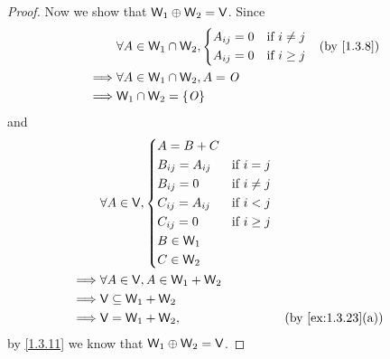 \begin{proof}
  Now we show that \(\mathsf{W}_1 \oplus \mathsf{W}_2 = \mathsf{V}\).
  Since
  \begin{align*}
             & \forall A \in \W_1 \cap \W_2, \begin{dcases}
      A_{i j} = 0 & \text{if } i \neq j \\
      A_{i j} = 0 & \text{if } i \geq j
    \end{dcases} &  & \text{(by \cref{1.3.8})} \\
    \implies & \forall A \in \W_1 \cap \W_2, A = \zm                                                  \\
    \implies & \W_1 \cap \W_2 = \set{\zm}
  \end{align*}
  and
  \begin{align*}
             & \forall A \in \V, \begin{dcases}
      A = B + C                               \\
      B_{i j} = A_{i j} & \text{if } i = j    \\
      B_{i j} = 0       & \text{if } i \neq j \\
      C_{i j} = A_{i j} & \text{if } i < j    \\
      C_{i j} = 0       & \text{if } i \geq j \\
      B \in \W_1                              \\
      C \in \W_2
    \end{dcases}                                      \\
    \implies & \forall A \in \V, A \in \W_1 + \W_2                                               \\
    \implies & \V \subseteq \W_1 + \W_2                                                          \\
    \implies & \V = \W_1 + \W_2,                            &  & \text{(by \cref{ex:1.3.23}(a))}
  \end{align*}
  by \cref{1.3.11} we know that \(\mathsf{W}_1 \oplus \mathsf{W}_2 = \mathsf{V}\).
\end{proof}